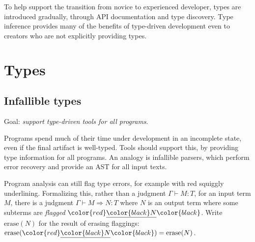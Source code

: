 \documentclass[acmsmall]{acmart}
\newcommand{\squnder}[1]{\color{red}\underline{{\color{black}#1}}\color{black}}
\newcommand{\infer}[2]{\frac{\textstyle#1}{\textstyle#2}}
\newcommand{\erase}{\mathrm{erase}}
\begin{document}
To help support the transition from novice to experienced developer,
types are introduced gradually, through API documentation and type discovery.
Type inference provides many of the benefits of type-driven development
even to creators who are not explicitly providing types.

\section{Types}
\subsection{Infallible types}

Goal: \emph{support type-driven tools for all programs}.

Programs spend much of their time under development in an incomplete state, even if the final artifact
is well-typed. Tools should support this, by providing type information for all programs.
An analogy is infallible parsers, which perform error recovery and provide an AST for all input texts.

Program analysis can still flag type errors, for example with red
squiggly underlining. Formalizing this, rather than a judgment
$\Gamma\vdash M:T$, for an input term $M$, there is a judgment
$\Gamma \vdash M \Rightarrow N : T$ where $N$ is an output term
where some subterms are \emph{flagged} $\squnder{N}$. Write $\erase(N)$
for the result of erasing flaggings: $\erase(\squnder{N}) = \erase(N)$.

\end{document}
